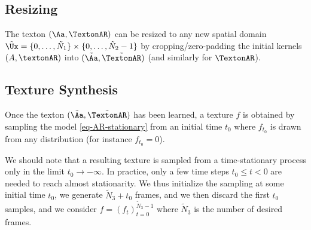 \subsection{Resizing}

The texton $(\Aa,\TextonAR)$ can be resized to any new spatial domain $\tilde \Ux = \{0,\ldots,\tilde N_1 \} \times \{0,\ldots,\tilde N_2 -1 \}$ by cropping/zero-padding the initial kernels $(A,\textonAR)$ into $(\tilde \Aa, \tilde \TextonAR)$
(and similarly for $\TextonAR$).

\subsection{Texture Synthesis} 

Once the texton $(\tilde\Aa,\tilde\TextonAR)$ has been learned, a texture $f$ is obtained by sampling the model \eqref{eq-AR-stationary} from an initial time $t_0$
where $f_{t_0}$ is drawn from any distribution (for instance $f_{t_0}=0$).

We should note that a resulting texture is sampled from a time-stationary process only in the limit $t_0 \rightarrow -\infty$. In practice, only a few time steps $t_0 \leq t < 0$ are needed to reach almost stationarity. We thus initialize the sampling at some initial time $t_0$, we generate $\tilde N_3+t_0$ frames,  and we then discard the first $t_0$ samples, and we  consider $f = (f_{t})_{t=0}^{\tilde N_3-1}$ where $\tilde N_3$ is the number of desired frames. 
